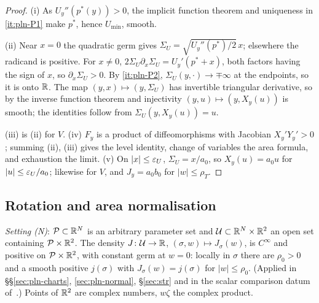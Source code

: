 \begin{proof}
(i) As $U_y''(p^*(y))>0$, the implicit function theorem and uniqueness in \ref{it:pln-P1} make $p^*$, hence $U_{\min}$, smooth.

(ii) Near $x=0$ the quadratic germ gives $\Sigma_U=\sqrt{U_y''(p^*)/2}\,x$; elsewhere the radicand is positive. For $x\ne0$, $2\Sigma_U\partial_x\Sigma_U=U_y'(p^*+x)$, both factors having the sign of $x$, so $\partial_x\Sigma_U>0$. By \ref{it:pln-P2}, $\Sigma_U(y,\cdot)\to\mp\infty$ at the endpoints, so it is onto $\mathbb{R}$. The map $(y,x)\mapsto(y,\Sigma_U)$ has invertible triangular derivative, so by the inverse function theorem and injectivity $(y,u)\mapsto(y,X_y(u))$ is smooth; the identities follow from $\Sigma_U(y,X_y(u))=u$.

(iii) is (ii) for $V$. (iv) $F_y$ is a product of diffeomorphisms with Jacobian $X_y'Y_y'>0$; summing (ii), (iii) gives the level identity, change of variables the area formula, and exhaustion the limit. (v) On $|x|\le\varepsilon_U$, $\Sigma_U=x/a_0$, so $X_y(u)=a_0u$ for $|u|\le\varepsilon_U/a_0$; likewise for $V$, and $J_y=a_0b_0$ for $|w|\le\rho_T$.
\end{proof}

\subsection{Rotation and area normalisation}\label{sec:pln-normalisation-maps}

\emph{Setting (N)}: $\mathcal P\subset\mathbb{R}^N$ is an arbitrary parameter set and $\mathcal U\subset\mathbb{R}^N\times\mathbb{R}^2$ an open set containing $\mathcal P\times\mathbb{R}^2$. The density $J\colon\mathcal U\to\mathbb{R}$, $(\sigma,w)\mapsto J_\sigma(w)$, is $C^\infty$ and positive on $\mathcal P\times\mathbb{R}^2$, with constant germ at $w=0$: locally in $\sigma$ there are $\rho_0>0$ and a smooth positive $j(\sigma)$ with $J_\sigma(w)=j(\sigma)$ for $|w|\le\rho_0$. (Applied in \S\S\ref{sec:pln-charts}, \ref{sec:pln-normal}, \S\ref{sec:str} and in the scalar comparison datum of~\cite{SongHD}.) Points of $\mathbb{R}^2$ are complex numbers, $w\zeta$ the complex product.

